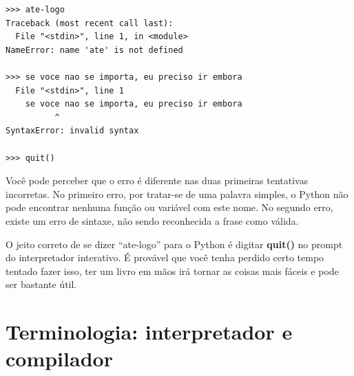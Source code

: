 \beforeverb
\begin{verbatim}
>>> ate-logo
Traceback (most recent call last):
  File "<stdin>", line 1, in <module>
NameError: name 'ate' is not defined

>>> se voce nao se importa, eu preciso ir embora
  File "<stdin>", line 1
    se voce nao se importa, eu preciso ir embora
          ^
SyntaxError: invalid syntax

>>> quit()
\end{verbatim}
\afterverb
%

%
%

Você pode perceber que o erro é diferente nas duas primeiras
tentativas incorretas. No primeiro erro, por tratar-se de uma
palavra simples, o Python não pode encontrar nenhuma função ou
variável com este nome. No segundo erro, existe um erro de sintaxe,
não sendo reconhecida a frase como válida.
%

O jeito correto de se dizer ``ate-logo'' para o Python é
digitar {\bf quit()} no prompt do interpretador interativo.
É provável que você tenha perdido certo tempo tentado fazer isso,
ter um livro em mãos irá tornar as coisas mais fáceis e 
pode ser bastante útil. 
%

\section{Terminologia: interpretador e compilador}
%

